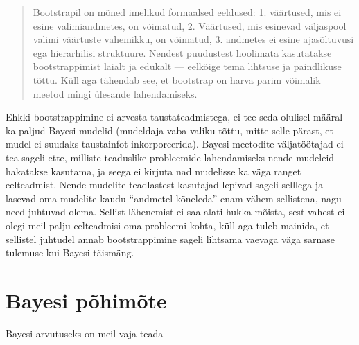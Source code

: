 \documentclass[]{book}
\begin{document}
\begin{quote}
Bootstrapil on mõned imelikud formaalsed eeldused:
1. väärtused, mis ei esine valimiandmetes, on võimatud, 2. Väärtused, mis esinevad väljaspool valimi väärtuste vahemikku, on võimatud, 3. andmetes ei esine ajasõltuvusi ega hierarhilisi struktuure. Nendest puudustest hoolimata kasutatakse bootstrappimist laialt ja edukalt --- eelkõige tema lihtsuse ja paindlikuse tõttu. Küll aga tähendab see, et bootstrap on harva parim võimalik meetod mingi ülesande lahendamiseks.
\end{quote}

Ehkki bootstrappimine ei arvesta taustateadmistega, ei tee seda olulisel määral ka paljud Bayesi mudelid (mudeldaja vaba valiku tõttu, mitte selle pärast, et mudel ei suudaks taustainfot inkorporeerida). Bayesi meetodite väljatöötajad ei tea sageli ette, milliste teaduslike probleemide lahendamiseks nende mudeleid hakatakse kasutama, ja seega ei kirjuta nad mudelisse ka väga ranget eelteadmist. Nende mudelite teadlastest kasutajad lepivad sageli selllega ja lasevad oma mudelite kaudu ``andmetel kõneleda'' enam-vähem sellistena, nagu need juhtuvad olema. Sellist lähenemist ei saa alati hukka mõista, sest vahest ei olegi meil palju eelteadmisi oma probleemi kohta, küll aga tuleb mainida, et sellistel juhtudel annab bootstrappimine sageli lihtsama vaevaga väga sarnase tulemuse kui Bayesi täismäng.

\hypertarget{bayesi-pohimote}{%
\chapter{Bayesi põhimõte}\label{bayesi-pohimote}}

Bayesi arvutuseks on meil vaja teada
\end{document}

